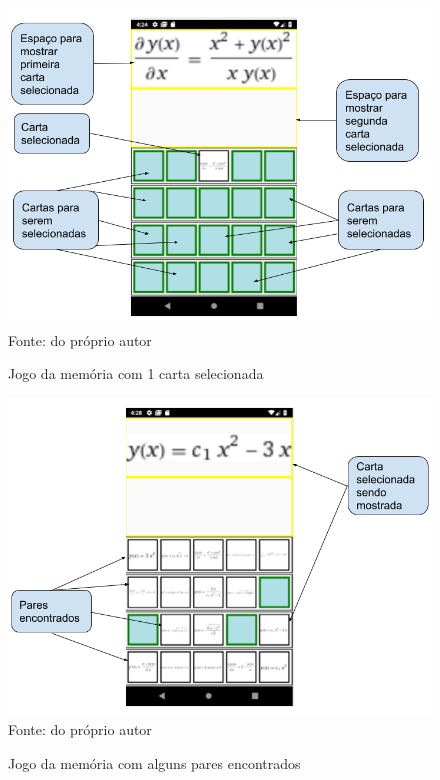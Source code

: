 \begin{figure}[H]
\centering
\caption{Jogo da memória com 1 carta selecionada}
\includegraphics[width=\textwidth,height=\textheight,keepaspectratio]{figuras/resolucao_1imagem.png}
\small{Fonte: do próprio autor}
\end{figure}

\begin{figure}[H]
\centering
\caption{Jogo da memória com alguns pares encontrados}
\includegraphics[width=\textwidth,height=\textheight,keepaspectratio]{figuras/resolucaoCartasAcertadas.png}
\small{Fonte: do próprio autor}
\end{figure}

